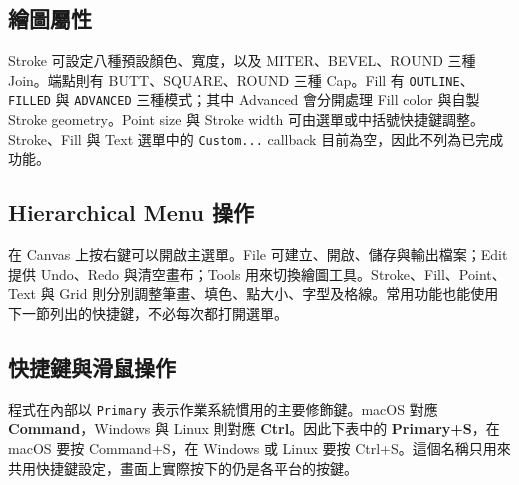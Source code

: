 \subsection{繪圖屬性}

Stroke 可設定八種預設顏色、寬度，以及 MITER、BEVEL、ROUND 三種 Join。端點則有 BUTT、SQUARE、ROUND 三種 Cap。Fill 有 \lstinline|OUTLINE|、\lstinline|FILLED| 與 \lstinline|ADVANCED| 三種模式；其中 Advanced 會分開處理 Fill color 與自製 Stroke geometry。Point size 與 Stroke width 可由選單或中括號快捷鍵調整。Stroke、Fill 與 Text 選單中的 \lstinline|Custom...| callback 目前為空，因此不列為已完成功能。

\subsection{Hierarchical Menu 操作}

在 Canvas 上按右鍵可以開啟主選單。File 可建立、開啟、儲存與輸出檔案；Edit 提供 Undo、Redo 與清空畫布；Tools 用來切換繪圖工具。Stroke、Fill、Point、Text 與 Grid 則分別調整筆畫、填色、點大小、字型及格線。常用功能也能使用下一節列出的快捷鍵，不必每次都打開選單。

\subsection{快捷鍵與滑鼠操作}

程式在內部以 \lstinline|Primary| 表示作業系統慣用的主要修飾鍵。macOS 對應 \textbf{Command}，Windows 與 Linux 則對應 \textbf{Ctrl}。因此下表中的 \textbf{Primary+S}，在 macOS 要按 Command+S，在 Windows 或 Linux 要按 Ctrl+S。這個名稱只用來共用快捷鍵設定，畫面上實際按下的仍是各平台的按鍵。

